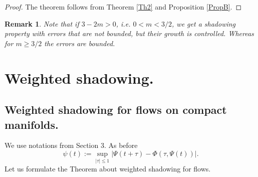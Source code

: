 \documentclass[11pt]{article}
\newcounter{razdel}[section]
\theoremstyle{Mystyle}
\newtheorem{Remark}[razdel]{Remark}
\begin{document}
\begin{proof}
The theorem follows from Theorem \ref{Th2} and Proposition \ref{PropB}.
\end{proof}

\begin{Remark}
Note that if $3-2m>0$, i.e. $0<m<3/2$, we get a shadowing property with errors that are not bounded, but their growth is controlled.
Whereas for $m\geq 3/2$ the errors are bounded.
\end{Remark}




\section{Weighted shadowing.}

\subsection{Weighted shadowing for flows on compact manifolds.}

We use notations from Section 3. As before $$\psi(t):=\sup_{|\tau|\leq 1}|\Psi(t+\tau) - \Phi(\tau,\Psi(t))|.$$ Let us formulate the Theorem about weighted shadowing for flows.
\end{document}
